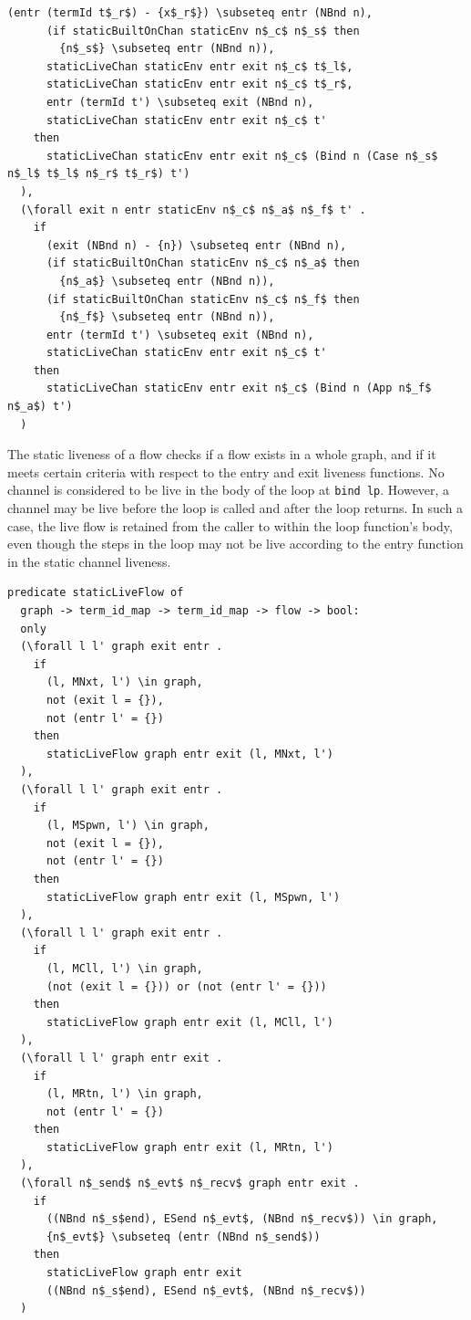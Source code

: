 \documentclass[10pt]{article}
\begin{document}
\begin{lstlisting}[language=logic, mathescape]
      (entr (termId t$_r$) - {x$_r$}) \subseteq entr (NBnd n),
      (if staticBuiltOnChan staticEnv n$_c$ n$_s$ then
        {n$_s$} \subseteq entr (NBnd n)),
      staticLiveChan staticEnv entr exit n$_c$ t$_l$,
      staticLiveChan staticEnv entr exit n$_c$ t$_r$,
      entr (termId t') \subseteq exit (NBnd n),
      staticLiveChan staticEnv entr exit n$_c$ t'
    then 
      staticLiveChan staticEnv entr exit n$_c$ (Bind n (Case n$_s$ n$_l$ t$_l$ n$_r$ t$_r$) t')
  ),
  (\forall exit n entr staticEnv n$_c$ n$_a$ n$_f$ t' .
    if
      (exit (NBnd n) - {n}) \subseteq entr (NBnd n),
      (if staticBuiltOnChan staticEnv n$_c$ n$_a$ then
        {n$_a$} \subseteq entr (NBnd n)),
      (if staticBuiltOnChan staticEnv n$_c$ n$_f$ then
        {n$_f$} \subseteq entr (NBnd n)),
      entr (termId t') \subseteq exit (NBnd n),
      staticLiveChan staticEnv entr exit n$_c$ t'
    then
      staticLiveChan staticEnv entr exit n$_c$ (Bind n (App n$_f$ n$_a$) t')
  )
\end{lstlisting}

The static liveness of a flow checks if a flow exists in a whole graph,
and if it meets certain criteria with respect to the entry and exit liveness
functions. 
No channel is considered to be live in the body of the loop at \lstinline[language=normal_lang]{bind lp}.
However, a channel may be live before the loop is
called and after the loop returns. In such a case, the live flow is retained
from the caller to within the loop function's body, even though the steps in
the loop may not be live according to the entry function in the static channel liveness.

\begin{lstlisting}[language=logic, mathescape]
  predicate staticLiveFlow of
  graph -> term_id_map -> term_id_map -> flow -> bool:
  only
  (\forall l l' graph exit entr . 
    if
      (l, MNxt, l') \in graph,
      not (exit l = {}),
      not (entr l' = {})
    then
      staticLiveFlow graph entr exit (l, MNxt, l')
  ),
  (\forall l l' graph exit entr .
    if
      (l, MSpwn, l') \in graph, 
      not (exit l = {}),
      not (entr l' = {})
    then
      staticLiveFlow graph entr exit (l, MSpwn, l')
  ),
  (\forall l l' graph exit entr .
    if
      (l, MCll, l') \in graph,
      (not (exit l = {})) or (not (entr l' = {}))
    then
      staticLiveFlow graph entr exit (l, MCll, l')
  ),
  (\forall l l' graph entr exit .
    if
      (l, MRtn, l') \in graph,
      not (entr l' = {})
    then
      staticLiveFlow graph entr exit (l, MRtn, l')
  ),
  (\forall n$_send$ n$_evt$ n$_recv$ graph entr exit .
    if
      ((NBnd n$_s$end), ESend n$_evt$, (NBnd n$_recv$)) \in graph, 
      {n$_evt$} \subseteq (entr (NBnd n$_send$))
    then
      staticLiveFlow graph entr exit
      ((NBnd n$_s$end), ESend n$_evt$, (NBnd n$_recv$))
  )
\end{lstlisting}
\end{document}
